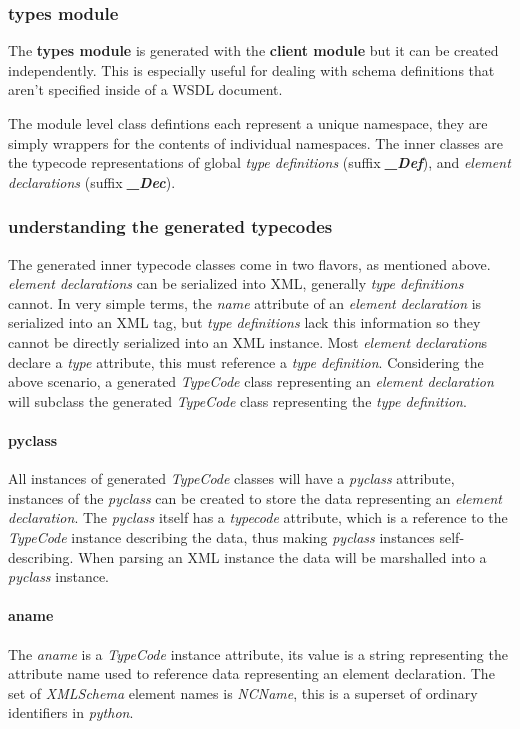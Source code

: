 \subsubsection{types module}
The {\bfseries types module} is generated with the {\bfseries client module} but
it can be created independently.  This is especially useful for dealing with
schema definitions that aren't specified inside of a WSDL document.  

The module level class defintions each represent a unique namespace, they are
simply wrappers for the contents of individual namespaces.  The inner classes
are the typecode representations of global {\it type definitions} (suffix {\it \bfseries _Def}), 
and {\it element declarations} (suffix {\it \bfseries _Dec}).

\subsubsection{understanding the generated typecodes}
The generated inner typecode classes come in two flavors, as mentioned above. 
{\it element declarations} can be serialized into XML, generally {\it type
definitions} cannot. In very simple terms, the {\it name} attribute of an {\it element declaration} is serialized into an XML tag, but {\it type
definitions} lack this information so they cannot be directly serialized into an
XML instance.  Most {\it element declaration}s declare a {\it type} attribute,
this must reference a {\it type definition}.  Considering the above scenario, a
generated {\it TypeCode} class representing an {\it element declaration} will
subclass the generated {\it TypeCode} class representing the {\it type 
definition}.

\paragraph{pyclass}
All instances of generated {\it TypeCode} classes will have a {\it pyclass}
attribute, instances of the {\it pyclass} can be created to store the data
representing an {\it element declaration}.  The {\it pyclass} itself has a {\it
typecode} attribute, which is a reference to the {\it
TypeCode} instance describing the data, thus making {\it pyclass} instances 
self-describing. 
When parsing an XML instance the data will be marshalled into a {\it pyclass}
instance.

\paragraph{aname}
The {\it aname} is a {\it TypeCode} instance attribute, its value is a string representing the
attribute name used to reference data representing an element declaration. The set 
of {\it XMLSchema} element names is {\it NCName}, this is a superset of ordinary
 identifiers in {\it python}.

